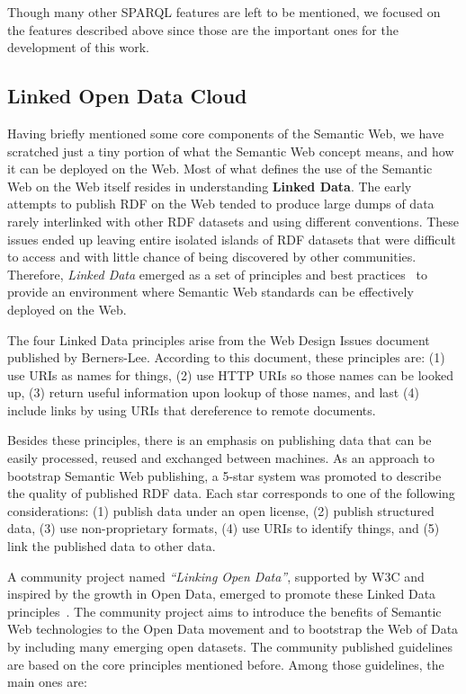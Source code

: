 Though many other SPARQL features are left to be mentioned, we focused on the features described 
above since those are the important ones for the development of this work.

\subsection{Linked Open Data Cloud}
Having briefly mentioned some core components of the Semantic Web, we have scratched just a tiny 
portion of what the Semantic Web concept means, and how it can be deployed on the Web. Most of 
what defines the use of the Semantic Web on the Web itself resides in understanding 
\textbf{Linked Data}. The early attempts to publish RDF on the Web tended to produce large dumps 
of data rarely interlinked with other RDF datasets and using different conventions. These issues 
ended up leaving entire isolated islands of RDF datasets that were difficult to access and with 
little chance of being discovered by other communities. Therefore, \textit{Linked Data} emerged as 
a set of principles and best practices~\cite{key:ldprinciples} to provide an environment where 
Semantic Web standards can be effectively deployed on the Web.

The four Linked Data principles arise from the Web Design Issues document published by 
Berners-Lee\cite{key:ldprinciples}. According to this document, these principles are: (1) use URIs 
as names for things, (2) use HTTP URIs so those names can be looked up, (3) return useful 
information upon lookup of those names, and last (4) include links by using URIs that dereference 
to remote documents. 

Besides these principles, there is an emphasis on publishing data that can be easily processed, 
reused and exchanged between machines. As an approach to bootstrap Semantic Web publishing, 
a 5-star system\cite{key:ldprinciples} was promoted to describe the quality of published RDF data. 
Each star corresponds to one of the following considerations: (1) publish data under an open license, 
(2) publish structured data, (3) use non-proprietary formats, (4) use URIs to identify things, and 
(5) link the published data to other data.

A community project named \textit{“Linking Open Data”}, supported by W3C and inspired by the growth 
in Open Data, emerged to promote these Linked Data principles~\cite{key:ldbook}. The community 
project aims to introduce the benefits of Semantic Web technologies to the Open Data movement and 
to bootstrap the Web of Data by including many emerging open datasets. The community published 
guidelines are based on the core principles mentioned before. Among those guidelines, the main 
ones are:

